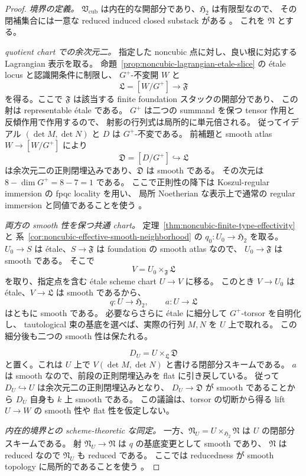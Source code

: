 \begin{proof}
\emph{境界の定義。}
$\mathfrak V_{\mathrm{cub}}$ は内在的な開部分であり、$\mathfrak H_2$ は有限型なので、
その閉補集合には一意な reduced induced closed substack がある
\cite[Tag 0509, Lemma 100.10.1]{StacksReducedBoundary}。
これを $\mathfrak N$ とする。

\emph{quotient chart での余次元二。}
指定した noncubic 点に対し、良い根に対応する Lagrangian 表示を取る。
命題~\ref{prop:noncubic-lagrangian-etale-slice} の étale locus と認識開条件に制限し、
$G^+$-不変開 $W$ と
\[
 \mathfrak L=[W/G^+]\longrightarrow\mathfrak F
\]
を得る。ここで $\mathfrak F$ は該当する finite foundation スタックの開部分であり、
この射は representable étale である。
$G^+$ は二つの summand を保つ tensor 作用と反傾作用で作用するので、
射影の行列式は局所的に単元倍される。
従ってイデアル $(\det M,\det N)$ と $D$ は $G^+$-不変である。
前補題と smooth atlas $W\to[W/G^+]$ により
\[
 \mathfrak D=[D/G^+]\hookrightarrow\mathfrak L
\]
は余次元二の正則閉埋込みであり、$\mathfrak D$ は smooth である。
その次元は $8-\dim G^+=8-7=1$ である。
ここで正則性の降下は Koszul-regular immersion の fpqc locality を用い、
局所 Noetherian な表示上で通常の regular immersion と同値であることを使う
\cite[Tags 0694, 063L]{StacksReducedBoundary}。

\emph{両方の smooth 性を保つ共通 chart。}
定理~\ref{thm:noncubic-finite-type-effectivity} と
系~\ref{cor:noncubic-effective-smooth-neighborhood} の
$q_0:U_0\to\mathfrak H_2$ を取る。
$U_0\to S$ は étale、$S\to\mathfrak F$ は foundation の smooth atlas なので、
$U_0\to\mathfrak F$ は smooth である。
そこで
\[
 V=U_0\times_{\mathfrak F}\mathfrak L
\]
を取り、指定点を含む étale scheme chart $U\to V$ に移る。
このとき $V\to U_0$ は étale、$V\to\mathfrak L$ は smooth であるから、
\[
 q:U\longrightarrow\mathfrak H_2,
 \qquad a:U\longrightarrow\mathfrak L
\]
はともに smooth である。
必要ならさらに étale に細分して $G^+$-torsor を自明化し、
tautological 束の基底を選べば、実際の行列 $M,N$ を $U$ 上で取れる。
この細分後も二つの smooth 性は保たれる。

\[
 D_U=U\times_{\mathfrak L}\mathfrak D
\]
と置く。これは $U$ 上で $V(\det M,\det N)$ と書ける閉部分スキームである。
$a$ は smooth なので、前段の正則閉埋込みを flat に引き戻している。
従って $D_U\hookrightarrow U$ は余次元二の正則閉埋込みとなり、
$D_U\to\mathfrak D$ が smooth であることから $D_U$ 自身も $k$ 上 smooth である。
この議論は、torsor の切断から得る lift $U\to W$ の smooth 性や flat 性を仮定しない。

\emph{内在的境界との scheme-theoretic な同定。}
一方、$\mathfrak N_U=U\times_{\mathfrak H_2}\mathfrak N$ は $U$ の閉部分スキームである。
射 $\mathfrak N_U\to\mathfrak N$ は $q$ の基底変更として smooth であり、
$\mathfrak N$ は reduced なので $\mathfrak N_U$ も reduced である。
ここでは reducedness が smooth topology に局所的であることを使う
\cite[Tag 034E]{StacksReducedBoundary}。


\end{proof}
